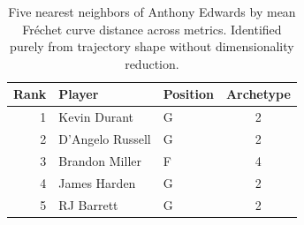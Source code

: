 \begin{table}[htbp]
  \centering\small
  \begin{tabular}{rllc}
    \toprule
    Rank & Player & Position & Archetype \\
    \midrule
    1 & Kevin Durant & G & 2 \\
    2 & D'Angelo Russell & G & 2 \\
    3 & Brandon Miller & F & 4 \\
    4 & James Harden & G & 2 \\
    5 & RJ Barrett & G & 2 \\
    \bottomrule
  \end{tabular}
  \caption{Five nearest neighbors of Anthony Edwards by mean Fr\'{e}chet curve distance across metrics. Identified purely from trajectory shape without dimensionality reduction.}
  \label{tab:Anthony_Edwards_frechet_curve_neighbors}
\end{table}

